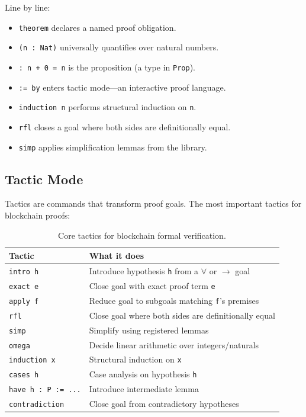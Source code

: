\documentclass[11pt,a4paper]{article}
\begin{document}
Line by line:
\begin{itemize}[nosep]
  \item \texttt{theorem} declares a named proof obligation.
  \item \texttt{(n : Nat)} universally quantifies over natural numbers.
  \item \texttt{: n + 0 = n} is the proposition (a type in \texttt{Prop}).
  \item \texttt{:= by} enters tactic mode---an interactive proof language.
  \item \texttt{induction n} performs structural induction on \texttt{n}.
  \item \texttt{rfl} closes a goal where both sides are definitionally equal.
  \item \texttt{simp} applies simplification lemmas from the library.
\end{itemize}

\subsection{Tactic Mode}

Tactics are commands that transform proof goals. The most important tactics for blockchain
proofs:

\begin{table}[H]
\centering
\small
\begin{tabular}{@{}ll@{}}
\toprule
\textbf{Tactic} & \textbf{What it does} \\
\midrule
\texttt{intro h} & Introduce hypothesis \texttt{h} from a $\forall$ or $\to$ goal \\
\texttt{exact e} & Close goal with exact proof term \texttt{e} \\
\texttt{apply f} & Reduce goal to subgoals matching \texttt{f}'s premises \\
\texttt{rfl} & Close goal where both sides are definitionally equal \\
\texttt{simp} & Simplify using registered lemmas \\
\texttt{omega} & Decide linear arithmetic over integers/naturals \\
\texttt{induction x} & Structural induction on \texttt{x} \\
\texttt{cases h} & Case analysis on hypothesis \texttt{h} \\
\texttt{have h : P := ...} & Introduce intermediate lemma \\
\texttt{contradiction} & Close goal from contradictory hypotheses \\
\bottomrule
\end{tabular}
\caption{Core tactics for blockchain formal verification.}
\end{table}
\end{document}
